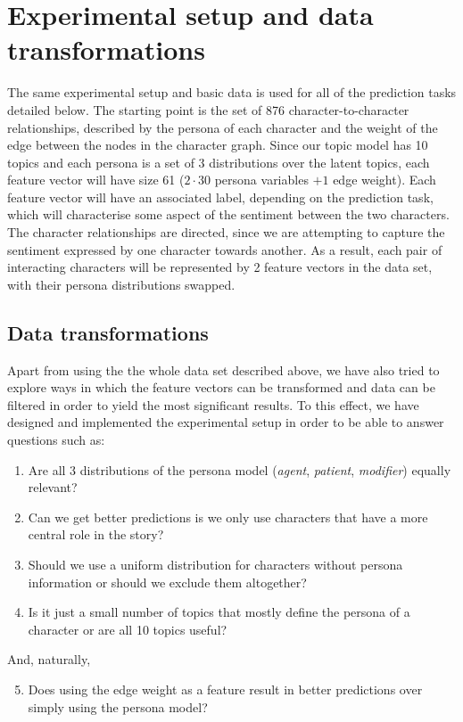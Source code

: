 \documentclass[bsc,frontabs,singlespacing,parskip]{infthesis} %
\begin{document}
\section{Experimental setup and data transformations}
The same experimental setup and basic data is used for all of the prediction tasks detailed below. The starting point is the set of 876 character-to-character relationships, described by the persona of each character and the weight of the edge between the nodes in the character graph. Since our topic model has 10 topics and each persona is a set of 3 distributions over the latent topics, each feature vector will have size 61 ($2 \cdot 30$ persona variables $+ 1$ edge weight). Each feature vector will have an associated label, depending on the prediction task, which will characterise some aspect of the sentiment between the two characters. The character relationships are directed, since we are attempting to capture the sentiment expressed by one character towards another. As a result, each pair of interacting characters will be represented by 2 feature vectors in the data set, with their persona distributions swapped.

\subsection{Data transformations}
Apart from using the the whole data set described above, we have also tried to explore ways in which the feature vectors can be transformed and data can be filtered in order to yield the most significant results. To this effect, we have designed and implemented the experimental setup in order to be able to answer questions such as:
\begin{enumerate}
	\item Are all 3 distributions of the persona model (\textit{agent}, \textit{patient}, \textit{modifier}) equally relevant?
	\item Can we get better predictions is we only use characters that have a more central role in the story?
	\item Should we use a uniform distribution for characters without persona information or should we exclude them altogether?
	\item Is it just a small number of topics that mostly define the persona of a character or are all 10 topics useful?
\end{enumerate}
And, naturally,
\begin{enumerate}
	\setcounter{enumi}{4}
	\item Does using the edge weight as a feature result in better predictions over simply using the persona model?
\end{enumerate}
\end{document}
